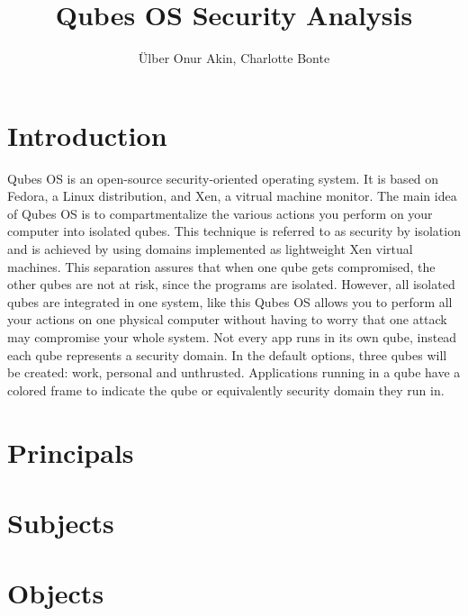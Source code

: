 \documentclass[runningheads,a4paper]{article}
\begin{document}
\title{Qubes OS Security Analysis}

\author{\"Ulber Onur Akin, Charlotte Bonte}

\maketitle

\tableofcontents
\section{Introduction}
Qubes OS is an open-source security-oriented operating system. It is based on Fedora, a Linux distribution, and Xen, a vitrual machine monitor. The main idea of Qubes OS is to compartmentalize the various actions you perform on your computer into isolated qubes. This technique is referred to as security by isolation and is achieved by using domains implemented as lightweight Xen virtual machines. This separation assures that when one qube gets compromised, the other qubes are not at risk, since the programs are isolated. However, all isolated qubes are integrated in one system, like this Qubes OS allows you to perform all your actions on one physical computer without having to worry that one attack may compromise your whole system. Not every app runs in its own qube, instead each qube represents a security domain. In the default options, three qubes will be created: work, personal and unthrusted. Applications running in a qube have a colored frame to indicate the qube or equivalently security domain they run in.

\section{Principals}
\section{Subjects}
\section{Objects}
\end{document}
